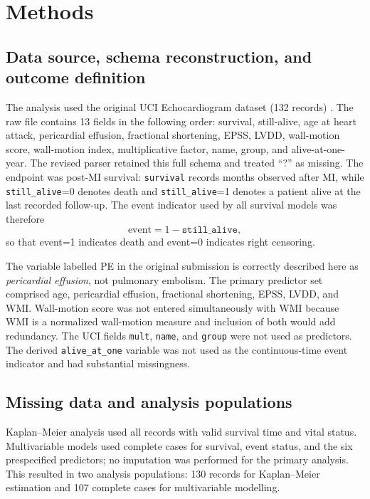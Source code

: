 \documentclass[a4paper,12pt]{article}
\begin{document}
\section{Methods}
\subsection{Data source, schema reconstruction, and outcome definition}
The analysis used the original UCI Echocardiogram dataset (132 records) \cite{ref44}. The raw file contains 13 fields in the following order: survival, still-alive, age at heart attack, pericardial effusion, fractional shortening, EPSS, LVDD, wall-motion score, wall-motion index, multiplicative factor, name, group, and alive-at-one-year. The revised parser retained this full schema and treated ``?'' as missing. The endpoint was post-MI survival: \texttt{survival} records months observed after MI, while \texttt{still\_alive}=0 denotes death and \texttt{still\_alive}=1 denotes a patient alive at the last recorded follow-up. The event indicator used by all survival models was therefore
\[
\text{event}=1-\texttt{still\_alive},
\]
so that event=1 indicates death and event=0 indicates right censoring.

The variable labelled PE in the original submission is correctly described here as \emph{pericardial effusion}, not pulmonary embolism. The primary predictor set comprised age, pericardial effusion, fractional shortening, EPSS, LVDD, and WMI. Wall-motion score was not entered simultaneously with WMI because WMI is a normalized wall-motion measure and inclusion of both would add redundancy. The UCI fields \texttt{mult}, \texttt{name}, and \texttt{group} were not used as predictors. The derived \texttt{alive\_at\_one} variable was not used as the continuous-time event indicator and had substantial missingness.

\subsection{Missing data and analysis populations}
Kaplan--Meier analysis used all records with valid survival time and vital status. Multivariable models used complete cases for survival, event status, and the six prespecified predictors; no imputation was performed for the primary analysis. This resulted in two analysis populations: 130 records for Kaplan--Meier estimation and 107 complete cases for multivariable modelling.
\end{document}

